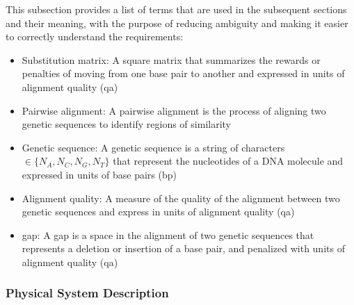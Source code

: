\documentclass[12pt]{article}
\begin{document}
This subsection provides a list of terms that are used in the subsequent
sections and their meaning, with the purpose of reducing ambiguity and making it
easier to correctly understand the requirements:

\begin{itemize}

\item Substitution matrix: A square matrix that summarizes 
the rewards or penalties of moving from one base pair to another and 
expressed in units of alignment quality (qa)
\item Pairwise alignment: A pairwise alignment is the process of aligning two genetic 
sequences to identify regions of similarity 
\item Genetic sequence: A genetic sequence is a string of characters $\in \{N_A, N_C, N_G, N_T\}$ that represent 
the nucleotides of a DNA molecule and expressed in units of base pairs (bp)
\item Alignment quality: A measure of the quality of the alignment between two genetic 
sequences and express in units of alignment quality (qa)
\item gap: A gap is a space in the alignment of two genetic sequences that represents
a deletion or insertion of a base pair, and penalized with units of alignment quality (qa)

\end{itemize}

\subsubsection{Physical System Description} \label{sec_phySystDescrip}

\end{document}
